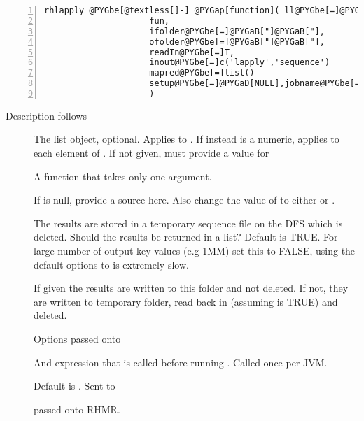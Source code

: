 \documentclass[letterpaper,10pt,english]{manual}
\begin{document}
\begin{Verbatim}[commandchars=@\[\],numbers=left,firstnumber=1,stepnumber=1]
rhlapply @PYGbe[@textless[]-] @PYGap[function]( ll@PYGbe[=]@PYGaD[NULL],
                     fun,
                     ifolder@PYGbe[=]@PYGaB["]@PYGaB["],
                     ofolder@PYGbe[=]@PYGaB["]@PYGaB["],
                     readIn@PYGbe[=]T,
                     inout@PYGbe[=]c('lapply','sequence')
                     mapred@PYGbe[=]list()
                     setup@PYGbe[=]@PYGaD[NULL],jobname@PYGbe[=]@PYGaB["]@PYGaB[rhlapply"],doLocal@PYGbe[=]F,...
                     )
\end{Verbatim}

Description follows
\begin{description}
\item[]
The list object, optional. Applies  to  .
If instead  is a numeric, applies  to each element of
. If not given, must provide a value for 

\item[]
A function that takes only one argument.

\item[]
If  is null, provide a source here. Also change the value of
 to either  or .

\item[]
The results are stored in a temporary sequence file on the DFS which is
deleted. Should the results be returned in a list? Default is TRUE. For
large number of output key-values (e.g 1MM) set this to FALSE, using the
default options to  is extremely slow.

\item[]
If given the results are written to this folder and not deleted. If not,
they are written to temporary folder, read back in (assuming 
is TRUE) and deleted.

\item[]
Options passed onto 

\item[]
And expression that is called before running . Called once per
JVM.

\item[]
Default is . Sent to 

\item[]
passed onto RHMR.

\end{description}
\end{document}

